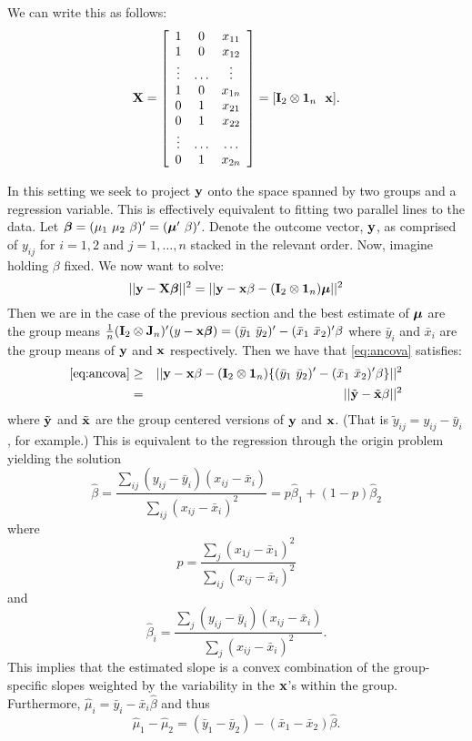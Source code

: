We can write this as follows:
$$
\mathbf{X} =
\left[
\begin{array}{ccc}
1 & 0  & x_{11} \\
1 & 0  & x_{12} \\
\vdots &  \ldots  & \vdots \\
1  & 0 & x_{1n}  \\
0  & 1 & x_{21} \\
0  & 1 & x_{22} \\
\vdots & \ldots & \ldots \\
0  & 1 & x_{2n}
\end{array}
\right]
= [\mathbf{I}_{2} \otimes \mathbf{1}_n ~~ \mathbf{x}]
.
$$

In this setting we seek to project $\mathbf{y}$ onto the space spanned by two groups
and a regression variable. This is effectively equivalent to fitting two parallel
lines to the data.
Let $\boldsymbol{\beta} = (\mu_1 \, \, \mu_2 \, \, \beta)' = (\boldsymbol{\mu}' \, \, \beta)'$. Denote the outcome
vector, $\mathbf{y}$, as comprised of $y_{ij}$ for $i=1,2$ and $j=1,\ldots,n$
stacked in the relevant order. Now, imagine holding $\beta$ fixed. We now want to solve:
\begin{equation}
\label{eq:ancova}
|| \mathbf{y} - \mathbf{X} \boldsymbol{\beta} ||^2 = 
|| \mathbf{y} - \mathbf{x} \beta - (\mathbf{I}_2 \otimes \mathbf{1}_n) \boldsymbol{\mu} ||^2 
\end{equation}
Then we are in the case of the previous section and the best estimate
of $\boldsymbol{\mu}$ are the group means $\frac{1}{n}(\mathbf{I}_2 \otimes \mathbf{J}_n)'(y - \mathbf{x} \boldsymbol{\beta}) = (\bar y_1 \, \, \bar y_2)' - (\bar x_1 \, \, \bar x_2)' \beta$ where
$\bar y_i$ and $\bar x_i$ are the group means of $\mathbf{y}$ and $\mathbf{x}$ respectively.
Then we have that \eqref{eq:ancova} satisfies:
\begin{eqnarray*}
\eqref{eq:ancova} &\geq&  || \mathbf{y} - \mathbf{x} \beta - (\mathbf{I}_2 \otimes \mathbf{1}_n) \{(\bar y_1 \, \, \bar y_2)' - (\bar x_1 \, \, \bar x_2)' \beta\}||^2  \\
&=& || \tilde {\mathbf{y}} - \tilde {\mathbf{x}} \beta||^2 
\end{eqnarray*}
where $\tilde {\mathbf{y}}$ and $\tilde {\mathbf{x}}$ are the group centered versions 
of $\mathbf{y}$ and $\mathbf{x}$. (That is $\tilde y_{ij} = y_{ij} - \bar y_i$, for example.)
This is equivalent to the regression through the origin problem yielding the solution
$$
\hat \beta 
= \frac{\sum_{ij} (y_{ij} - \bar y_i) (x_{ij} - \bar x_i)}
{\sum_{ij} (x_{ij} - \bar x_i)^2}
= p \hat \beta_1 + (1 - p) \hat \beta_2
$$
where 
$$
p = \frac{\sum_{j} (x_{1j} - \bar x_1)^2}{\sum_{ij} (x_{ij} - \bar x_i)^2}
$$
and 
$$
\hat \beta_i =
\frac{\sum_{j} (y_{ij} - \bar y_i) (x_{ij} - \bar x_i)}
{\sum_{j} (x_{ij} - \bar x_i)^2}.
$$
This implies that the estimated slope is a convex combination of the
group-specific slopes weighted by the variability in the $\mathbf{x}$'s
within the group. Furthermore,
$\hat \mu_i = \bar y_i - \bar x_i \hat \beta$ and thus
$$
\hat \mu_1 - \hat \mu_2
= (\bar y_1 - \bar y_2) - (\bar x_1 - \bar x_2) \hat \beta.
$$


